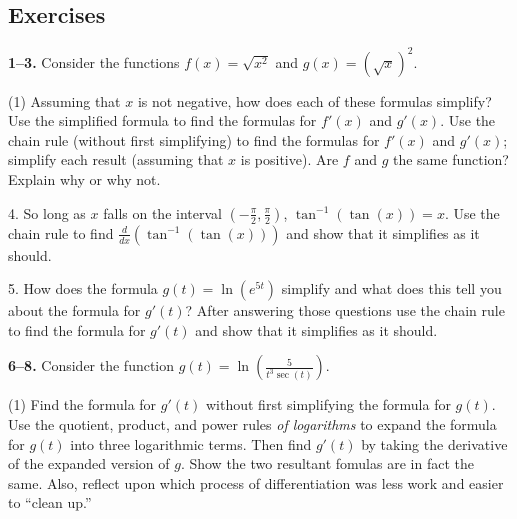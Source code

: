 \documentclass[10pt,oneside,]{book}
\theoremstyle{plain}
\theoremstyle{definition}
\numberwithin{equation}{section}
\newcommand{\fe}[2]{#1\mathopen{}\left(#2\right)\mathclose{}}
\newcommand{\ointerval}[2]{\left(#1,#2\right)}
\newcommand{\fd}[1]{#1'}
\newcommand{\lzoo}[2]{{\frac{d}{d#1}}{\left(#2\right)}}
\begin{document}
\subsection[Exercises]{Exercises}\label{exercises-45}
\textbf{1--3. }\hypertarget{exercisegroup-95}{\null}Consider the functions \(\fe{f}{x}=\sqrt{x^2}\) and \(\fe{g}{x}=\left(\sqrt{x}\right)^2\).%
\par
\begin{exercisegroup}(1)
\exercise[1.]\hypertarget{exercise-462}{\null}Assuming that \(x\) is not negative, how does each of these formulas simplify?  Use the simplified formula to find the formulas for \(\fe{\fd{f}}{x}\) and \(\fe{\fd{g}}{x}\).%
\exercise[2.]\hypertarget{exercise-463}{\null}Use the chain rule (without first simplifying) to find the formulas for \(\fe{\fd{f}}{x}\) and \(\fe{\fd{g}}{x}\); simplify each result (assuming that \(x\) is positive).%
\exercise[3.]\hypertarget{exercise-464}{\null}Are \(f\) and \(g\) the same function? Explain why or why not.%
\end{exercisegroup}
\par\smallskip\noindent
\begin{exerciselist}
\item[4.]\hypertarget{exercise-465}{\null}So long as \(x\) falls on the interval \(\ointerval{-\frac{\pi}{2}}{\frac{\pi}{2}}\), \(\fe{\tan^{-1}}{\fe{\tan}{x}}=x\). Use the chain rule to find \(\lzoo{x}{\fe{\tan^{-1}}{\fe{\tan}{x}}}\) and show that it simplifies as it should.%
\par\smallskip
\item[5.]\hypertarget{exercise-466}{\null}How does the formula \(\fe{g}{t}=\fe{\ln}{e^{5t}}\) simplify and what does this tell you about the formula for \(\fe{\fd{g}}{t}\)?  After answering those questions use the chain rule to find the formula for \(\fe{\fd{g}}{t}\) and show that it simplifies as it should.%
\par\smallskip
\end{exerciselist}
\textbf{6--8. }\hypertarget{exercisegroup-96}{\null}Consider the function \(\fe{g}{t}=\fe{\ln}{\frac{5}{t^3\fe{\sec}{t}}}\).%
\par
\begin{exercisegroup}(1)
\exercise[6.]\hypertarget{exercise-467}{\null}Find the formula for \(\fe{\fd{g}}{t}\) without first simplifying the formula for \(\fe{g}{t}\).%
\exercise[7.]\hypertarget{exercise-468}{\null}Use the quotient, product, and power rules \emph{of logarithms} to expand the formula for \(\fe{g}{t}\) into three logarithmic terms.  Then find \(\fe{\fd{g}}{t}\) by taking the derivative of the expanded version of \(g\). %
\exercise[8.]\hypertarget{exercise-469}{\null}Show the two resultant fomulas are in fact the same. Also, reflect upon which process of differentiation was less work and easier to ``clean up.''%
\end{exercisegroup}
\par\smallskip\noindent
\typeout{************************************************}
\typeout{************************************************}
\end{document}
